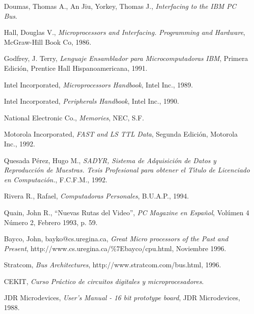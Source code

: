 \begin{thebibliography}{150}
 Doumas, Thomas A., An Jiu, Yorkey, Thomas J., {\em Interfacing to the IBM %
PC Bus}.

 Hall, Douglas V., {\em Microprocessors and Interfacing. Programming %
and Hardware\/}, McGraw-Hill Book Co, 1986.

 Godfrey, J. Terry, {\em Lenguaje Ensamblador para %
Microcomputadoras IBM\/}, Primera Edici\'on, Prentice Hall Hispanoamericana, 1991.

 Intel Incorporated, {\em Microprocessors Handbook\/}, Intel %
Inc., 1989.

 Intel Incorporated, {\em Peripherals Handbook\/}, Intel Inc., %
1990.

 National Electronic Co., {\em Memories\/}, NEC, S.F.

 Motorola Incorporated, {\em FAST and LS TTL Data\/}, Segunda %
Edici\'on, Motorola Inc., 1992.

 Quesada P\'erez, Hugo M., {\em SADYR, Sistema de Adquisici\'on de %
Datos y Reproducci\'on de Muestras. Tesis Profesional para obtener el T\'{\i}tulo de %
Licenciado en Computaci\'on.}, F.C.F.M., 1992.

 Rivera R., Rafael, {\em Computadoras Personales}, B.U.A.P., %
1994.

 Quain, John R., ``Nuevas Rutas del  Video'', {\em PC Magazine %
en Espa\~nol\/}, Vol\'umen 4 N\'umero 2, Febrero 1993, p. 59.

 Bayco, John, bayko@cs.uregina.ca, {\em Gre\-at Mi\-cro\-%
pro\-ce\-ssors of the Past and Pre\-sent\/}, http://www.cs.uregina.ca/\%7Ebayco/cpu.html, %
Noviembre 1996.

 Stratcom, {\em Bus Architectures\/}, %
http://www.stratcom.com/bus.html, 1996.

 CEKIT, {\em Curso Pr\'actico de circuitos digitales y %
microprocesadores\/}.

 JDR Microdevices, {\em User's Manual - 16 bit prototype board}, JDR %
Microdevices, 1988.

\end{thebibliography}
